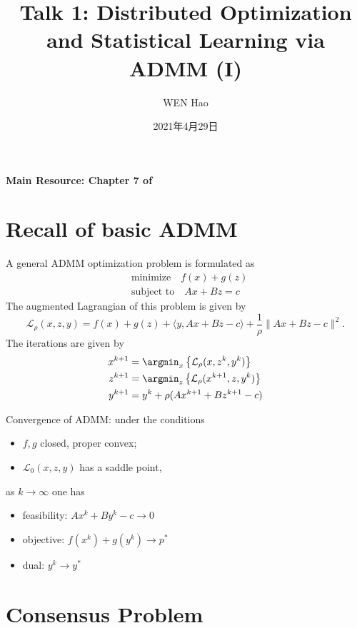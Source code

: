 
\usepackage{empheq}
\usepackage{cancel}



\title{Talk 1: Distributed Optimization and Statistical Learning via ADMM (I)}
\date{2021年4月29日}
\author{WEN Hao}

\maketitle

{\bfseries Main Resource: Chapter 7 of \cite{boyd2011distributed}}

\section{Recall of basic ADMM}

A general ADMM optimization problem is formulated as
\begin{align*}
    & \text{minimize} \quad f(x) + g(z) \\
    & \text{subject to} \quad Ax + Bz = c
\end{align*}
The augmented Lagrangian of this problem is given by
$$\mathcal{L}_{\rho}(x,z,y) = f(x) + g(z) + \langle y, Ax+Bz-c \rangle + \dfrac{1}{\rho}\lVert Ax+Bz-c \rVert^2.$$
The iterations are given by
\begin{align*}
    x^{k+1} & = \argmin_{x} \left\{ \mathcal{L}_{\rho}(x,z^k,y^k) \right\} \\
    z^{k+1} & = \argmin_{z} \left\{ \mathcal{L}_{\rho}(x^{k+1},z,y^k) \right\} \\
    y^{k+1} & = y^{k} + \rho (Ax^{k+1}+Bz^{k+1}-c)
\end{align*}

Convergence of ADMM: under the conditions
\begin{itemize}
    \item $f,g$ closed, proper convex;
    \item $\mathcal{L}_{0}(x,z,y)$ has a saddle point,
\end{itemize}
as $k\rightarrow\infty$ one has
\begin{itemize}
    \item feasibility: $Ax^k + By^k - c \rightarrow 0$
    \item objective: $f(x^k) + g(y^k) \rightarrow p^*$
    \item dual: $y^k \rightarrow y^*$
\end{itemize}

\section{Consensus Problem}

